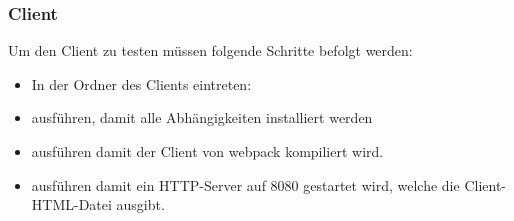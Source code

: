 \subsubsection{Client}
Um den Client zu testen müssen folgende Schritte befolgt werden:
\begin{itemize}
	\item In der Ordner des Clients eintreten: 
	\item {} ausführen, damit alle Abhängigkeiten installiert werden
	\item {} ausführen damit der Client von webpack kompiliert wird.
	\item {} ausführen damit ein HTTP-Server auf 8080 gestartet wird, welche die Client-HTML-Datei ausgibt.
\end{itemize}





